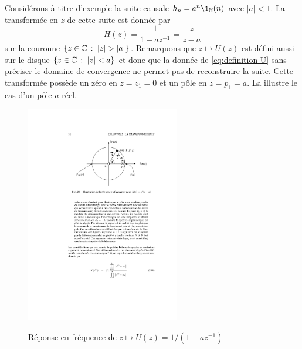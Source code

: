 Consid\'{e}rons  à  titre d'exemple la suite causale  $h_n=a^{n}\1_\nset(n)$ avec $|a|<1$. La transformée en $z$ de cette suite est donnée par
\begin{equation}
\label{eq:definition-U}
H(z)=\frac{1}{1-az^{-1}} = \frac{z}{z-a}
\end{equation}
sur la couronne $\ensemble{z \in \cset}{|z|>|a|}$. Remarquons que $z \mapsto U(z)$ est défini aussi sur le disque $\left\{z \in \mathbb{C}\,:\; |z|< a\right\}$ et donc que la donnée de \eqref{eq:definition-U} sans préciser le domaine de convergence ne permet pas de reconstruire la suite.
Cette transform\'{e}e poss\`{e}de un z\'{e}ro en $z=z_1=0$ et un p\^{o}le en $z=p_{1}=a$. La  illustre le cas d'un p\^{o}le
$a$ r\'{e}el.
\begin{figure}
  \centering
  \includegraphics[width=0.6\textwidth]{Figures/FigMignotte-1}\\
  \caption{Réponse en fréquence de $z \mapsto U(z)= 1/(1-az^{-1})$}\label{fig:FigMignotte-1}
\end{figure}

